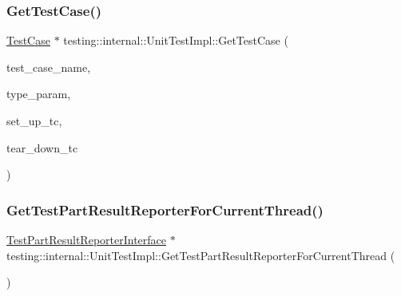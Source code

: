 \subsubsection{\texorpdfstring{Get\+Test\+Case()}{GetTestCase()}\hspace{0.1cm}{\footnotesize\ttfamily [2/2]}}
{\footnotesize\ttfamily \hyperlink{classtesting_1_1_test_case}{Test\+Case} $\ast$ testing\+::internal\+::\+Unit\+Test\+Impl\+::\+Get\+Test\+Case (\begin{DoxyParamCaption}\item[{const char $\ast$}]{test\+\_\+case\+\_\+name,  }\item[{const char $\ast$}]{type\+\_\+param,  }\item[{\hyperlink{classtesting_1_1_test_a5f2a051d1d99c9b784c666c586186cf9}{Test\+::\+Set\+Up\+Test\+Case\+Func}}]{set\+\_\+up\+\_\+tc,  }\item[{\hyperlink{classtesting_1_1_test_aa0f532e93b9f3500144c53f31466976c}{Test\+::\+Tear\+Down\+Test\+Case\+Func}}]{tear\+\_\+down\+\_\+tc }\end{DoxyParamCaption})}

\mbox{\label{classtesting_1_1internal_1_1_unit_test_impl_a5fb3dd8bc839e10b62eba07790704132}} 
\subsubsection{\texorpdfstring{Get\+Test\+Part\+Result\+Reporter\+For\+Current\+Thread()}{GetTestPartResultReporterForCurrentThread()}}
{\footnotesize\ttfamily \hyperlink{classtesting_1_1_test_part_result_reporter_interface}{Test\+Part\+Result\+Reporter\+Interface} $\ast$ testing\+::internal\+::\+Unit\+Test\+Impl\+::\+Get\+Test\+Part\+Result\+Reporter\+For\+Current\+Thread (\begin{DoxyParamCaption}{ }\end{DoxyParamCaption})}

\mbox{\label{classtesting_1_1internal_1_1_unit_test_impl_af8c7c0a0c954e36d83e6e4690d3fb938}} 
